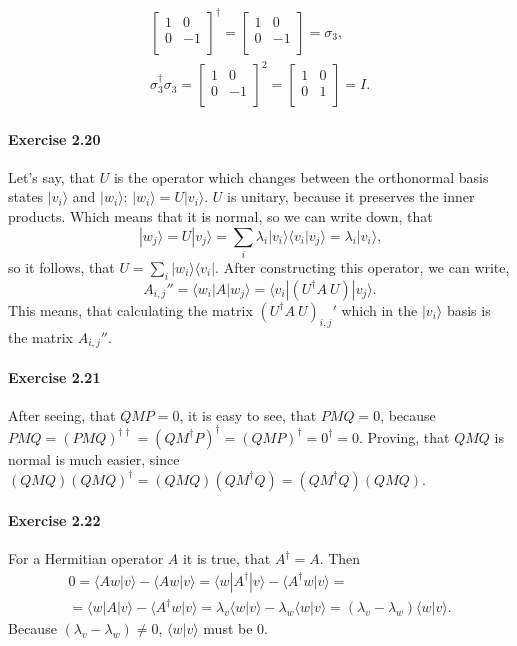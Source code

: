 \documentclass[a4paper,12pt]{article}
\newcommand{\exercise}[1]{\paragraph{Exercise #1}}
\newcommand{\la}{\langle}
\newcommand{\ra}{\rangle}
\begin{document}
\begin{gather}
\begin{bmatrix}
            1 & 0\\
            0 & -1\\
        \end{bmatrix} ^ \dagger =
        \begin{bmatrix}
            1 & 0\\
            0 & -1\\
        \end{bmatrix} =
        \sigma_3 \textrm{,} \\
        \sigma_3 ^ \dagger \sigma_3 =
        \begin{bmatrix}
            1 & 0\\
            0 & -1\\
        \end{bmatrix} ^ 2 =
        \begin{bmatrix}
            1 & 0\\
            0 & 1\\
        \end{bmatrix} = I \textrm{.}
    \end{gather}

    \exercise{2.20} Let's say, that $U$ is the operator which changes between the orthonormal basis states $| v_i \ra$ and $| w_i \ra$: $| w_i \ra = U | v_i \ra$. $U$ is unitary, because it preserves the inner products. Which means that it is normal, so we can write down, that
    \begin{equation}
        | w_j \ra = U | v_j \ra = \sum_i \lambda_i | v_i \ra \la v_i | v_j \ra = \lambda_i | v_i \ra \textrm{,}
    \end{equation}
    so it follows, that $U = \sum_i | w_i \ra \la v_i |$. After constructing this operator, we can write,
    \begin{equation}
        A_{i, j}'' = \la w_i | A | w_j \ra = \la v_i | (U ^\dagger A\ U) | v_j \ra \textrm{.}
    \end{equation}
    This means, that calculating the matrix $(U^\dagger A\ U)_{i, j}'$ which in the $| v_i \ra$ basis is the matrix $A_{i, j}''$.

    \exercise{2.21} After seeing, that $QMP = 0$, it is easy to see, that $PMQ = 0$, because $PMQ = (PMQ)^{\dagger \dagger} = (QM^\dagger P)^\dagger = (QMP)^\dagger = 0^\dagger = 0$. Proving, that $QMQ$ is normal is much easier, since $(QMQ) (QMQ)^\dagger = (QMQ) (QM^\dagger Q) = (QM^\dagger Q) (QMQ)$.

    \exercise{2.22} For a Hermitian operator $A$ it is true, that $A^\dagger = A$. Then
    \begin{gather}
        \nonumber
        0 = \la Aw | v \ra - \la Aw | v \ra =
        \la w | A^\dagger | v \ra - \la A^\dagger w | v \ra =\\
        = \la w | A | v \ra - \la A^\dagger w | v \ra =
        \lambda_v \la w | v \ra - \lambda_w \la w | v \ra =
        (\lambda_v - \lambda_w) \la w | v \ra \textrm{.}
    \end{gather}
    Because $(\lambda_v - \lambda_w) \neq 0$, $\la w | v \ra$ must be 0.
\end{document}
